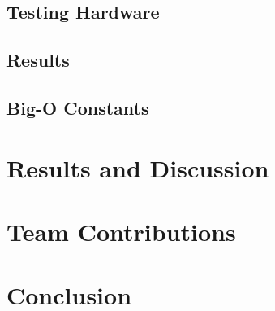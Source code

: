 \documentclass[titlepage]{article}
\begin{document}
\begin{multicols}{2}
			\subsection{Testing Hardware}
			\subsection{Results}
			\subsection{Big-O Constants}
		\section{Results and Discussion}
		\section{Team Contributions}
		\section{Conclusion}
	\end{multicols}
\end{document}
